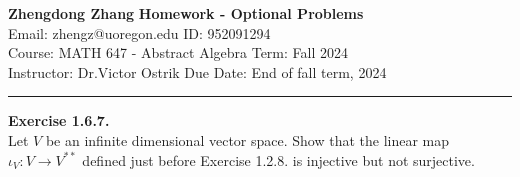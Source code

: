 \documentclass[a4paper, 12pt]{article}
\newenvironment{problem}[2][Exercise]
    { \begin{mdframed}[backgroundcolor=gray!20] \textbf{#1 #2} \\}
    {  \end{mdframed}}
\begin{document}
\noindent
\large\textbf{Zhengdong Zhang} \hfill \textbf{Homework - Optional Problems}   \\
Email: zhengz@uoregon.edu \hfill ID: 952091294 \\
\normalsize Course: MATH 647 - Abstract Algebra  \hfill Term: Fall 2024\\
Instructor: Dr.Victor Ostrik \hfill Due Date: End of fall term, 2024 \\
\noindent\rule{7in}{2.8pt}
\begin{problem}{1.6.7.}
Let \(V\) be an infinite dimensional vector space. Show that the linear map \(\iota_V:V\rightarrow V^{**}\) defined just before Exercise 1.2.8. is injective but not surjective.
\end{problem} 
\end{document}

